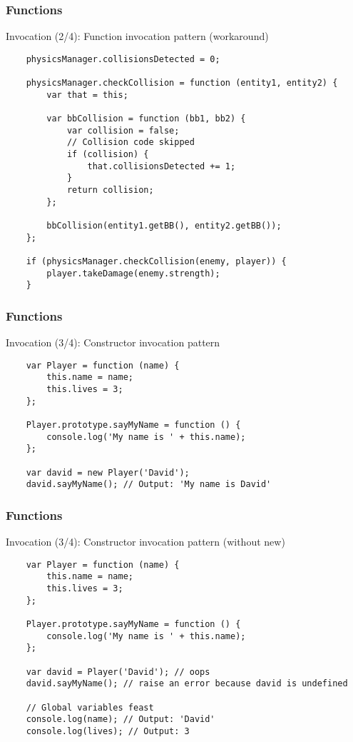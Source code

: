 \begin{frame}[fragile]
  \frametitle{Functions}

  \begin{block}{Invocation (2/4): Function invocation pattern (workaround)}
    {\scriptsize
    \begin{verbatim}
    physicsManager.collisionsDetected = 0;

    physicsManager.checkCollision = function (entity1, entity2) {
        var that = this;

        var bbCollision = function (bb1, bb2) {
            var collision = false;
            // Collision code skipped
            if (collision) {
                that.collisionsDetected += 1;
            }
            return collision;
        };

        bbCollision(entity1.getBB(), entity2.getBB());
    };

    if (physicsManager.checkCollision(enemy, player)) {
        player.takeDamage(enemy.strength);
    }
    \end{verbatim}
    }
  \end{block}
\end{frame}

\begin{frame}[fragile]
  \frametitle{Functions}

  \begin{block}{Invocation (3/4): Constructor invocation pattern}
    {\scriptsize
    \begin{verbatim}
    var Player = function (name) {
        this.name = name;
        this.lives = 3;
    };

    Player.prototype.sayMyName = function () {
        console.log('My name is ' + this.name);
    };

    var david = new Player('David');
    david.sayMyName(); // Output: 'My name is David'
    \end{verbatim}
    }
  \end{block}
\end{frame}

\begin{frame}[fragile]
  \frametitle{Functions}

  \begin{block}{Invocation (3/4): Constructor invocation pattern (without new)}
    {\scriptsize
    \begin{verbatim}
    var Player = function (name) {
        this.name = name;
        this.lives = 3;
    };

    Player.prototype.sayMyName = function () {
        console.log('My name is ' + this.name);
    };

    var david = Player('David'); // oops
    david.sayMyName(); // raise an error because david is undefined
    
    // Global variables feast
    console.log(name); // Output: 'David'
    console.log(lives); // Output: 3
    \end{verbatim}
    }
  \end{block}
\end{frame}

